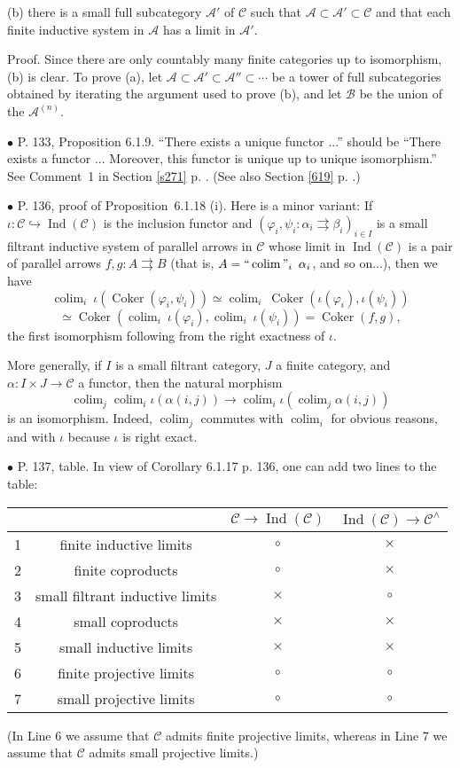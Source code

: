 \documentclass[12pt]{article}
\theoremstyle{remark}
\newcommand{\bu}{\bullet}
\newcommand{\n}{\noindent}
\newcommand{\A}{\mathcal A}
\newcommand{\B}{\mathcal B}
\newcommand{\C}{\mathcal C}
\newcommand{\p}{\varphi}
\newcommand{\pa}{\rightrightarrows}
\newcommand{\pr}{Proposition}
\DeclareMathOperator*{\coli}{colim}
\DeclareMathOperator*{\co}{colim}
\DeclareMathOperator*{\ic}{``\coli"}
\DeclareMathOperator{\Coker}{Coker}
\DeclareMathOperator{\Ind}{Ind}
\begin{document}
\n(b) there is a small full subcategory $\A'$ of $\C$ such that $\A\subset\A'\subset \C$ and that each finite inductive system in $\A$ has a limit in $\A'$.

\n Proof. Since there are only countably many finite categories up to isomorphism, (b) is clear. To prove (a), let $\A\subset\A'\subset\A''\subset\cdots$ be a tower of full subcategories obtained by iterating the argument used to prove (b), and let $\B$ be the union of the $\A^{(n)}$. 


\n$\bu$ P. 133, Proposition 6.1.9. ``There exists a unique functor ...'' should be ``There exists a functor ... Moreover, this functor is unique up to unique isomorphism.'' See Comment~1 in Section \ref{s271} p. \pageref{s271}. (See also Section \ref{619} p. \pageref{619}.) 


\n$\bu$ P. 136, proof of \pr\ 6.1.18 (i). Here is a minor variant: If $\iota:\C\hookrightarrow\Ind(\C)$ is the inclusion functor and $(\p_i,\psi_i:\alpha_i\pa\beta_i)_{i\in I}$ is a small filtrant inductive system of parallel arrows in $\C$ whose limit in $\Ind(\C)$ is a pair of parallel arrows $f,g:A\pa B$ (that is, $A=\ic_i\ \alpha_i$, and so on...), then we have 
$$
\co_i\ \iota(\Coker(\p_i,\psi_i))\simeq
\co_i\ \Coker(\iota(\p_i),\iota(\psi_i))
$$
$$
\simeq
\Coker(\co_i\ \iota(\p_i),\co_i\ \iota(\psi_i))=
\Coker(f,g),
$$ 
the first isomorphism following from the right exactness of $\iota$. 

More generally, if $I$ is a small filtrant category, $J$ a finite category, and $\alpha:I\times J\to\C$ a functor, then the natural morphism 
$$
\co_j\co_i\iota(\alpha(i,j))\to\co_i\iota\left(\co_j\alpha(i,j)\right) 
$$ 
is an isomorphism. Indeed, $\co_j$ commutes with $\co_i$ for obvious reasons, and with $\iota$ because $\iota$ is right exact. 


\n$\bu$ P. 137, table. In view of Corollary 6.1.17 p. 136, one can add two lines to the table:\bigskip 

\begin{center}
\begin{tabular}{|c|c|c|c|}\hline
&&$\C\to\Ind(\C)$&$\Ind(\C)\to\C^\wedge$\\ \hline
1&finite inductive limits&$\circ$&$\times$\\ \hline
2&finite coproducts&$\circ$&$\times$\\ \hline
3&small filtrant inductive limits&$\times$&$\circ$\\ \hline
4&small coproducts&$\times$&$\times$\\ \hline
5&small inductive limits&$\times$&$\times$\\ \hline
6&finite projective limits&$\circ$&$\circ$\\ \hline
7&small projective limits&$\circ$&$\circ$\\ \hline
\end{tabular}
\end{center}%
\n (In Line 6 we assume that $\C$ admits finite projective limits, whereas in Line 7 we assume that $\C$ admits small projective limits.)
\bigskip 
\end{document}
